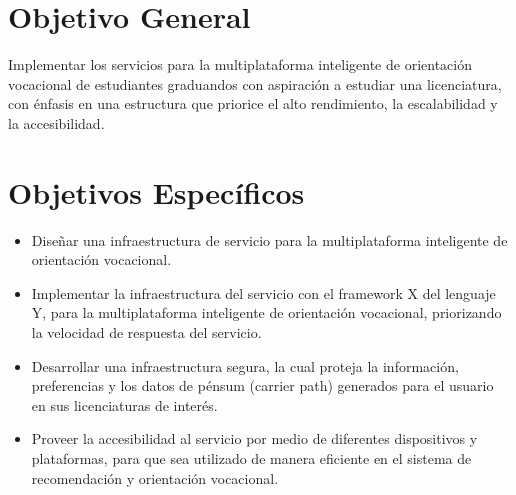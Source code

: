 \section{Objetivo General}
Implementar los servicios para la multiplataforma 
inteligente de orientación vocacional de estudiantes graduandos con aspiración a 
estudiar una licenciatura, con énfasis en una estructura que priorice el alto rendimiento,
la escalabilidad y la accesibilidad.

\section{Objetivos Específicos}
\begin{itemize}
\item Diseñar una infraestructura de servicio para la multiplataforma inteligente de orientación vocacional.
\item Implementar la infraestructura del servicio con el framework X del lenguaje Y, para la multiplataforma inteligente de orientación vocacional, priorizando la  velocidad de respuesta del servicio.
\item Desarrollar una infraestructura segura, la cual proteja la información, preferencias y los datos de pénsum (carrier path) generados para el usuario en sus licenciaturas de interés.
\item Proveer la accesibilidad al servicio por medio de diferentes dispositivos y plataformas, para que sea utilizado de manera eficiente en el sistema de recomendación y orientación vocacional.
\end{itemize}